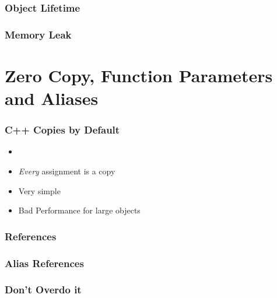 \documentclass[usenames,dvipsnames,svgnames,table,aspectratio=169]{beamer}
\begin{document}
\begin{frame}
    \frametitle{Object Lifetime}
    
\end{frame}

\begin{frame}
    \frametitle{Memory Leak}
    
\end{frame}


\section{Zero Copy, Function Parameters and Aliases}
\begin{frame}
    \frametitle{C++ Copies by Default}
    \begin{itemize}
        \item<+-> 
        \item<+-> \textit{Every} assignment is a copy
        \item<+-> Very simple
        \item<+-> Bad Performance for large objects
    \end{itemize}
\end{frame}

\begin{frame}
    \frametitle{References}
    
\end{frame}

\begin{frame}
    \frametitle{Alias References}
    
\end{frame}

\begin{frame}
    \frametitle{Don't Overdo it}
    
\end{frame}
\end{document}
